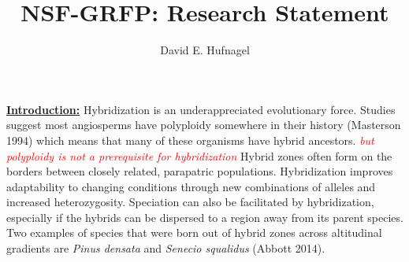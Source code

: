 \documentclass[12pt]{amsart}
\title{NSF-GRFP: Research Statement}
\author{David E. Hufnagel}
\newcommand{\mbh}[1]{\textcolor{red}{ \emph{\scriptsize  #1}} }
\begin{document}
\maketitle

\textbf{\underline{Introduction:} }
Hybridization is an underappreciated evolutionary force.
Studies suggest most angiosperms have polyploidy somewhere in their history (Masterson 1994) which means that many of these organisms have hybrid ancestors. \mbh{but polyploidy is not a prerequisite for hybridization}
Hybrid zones often form on the borders between closely related, parapatric populations. %
Hybridization improves adaptability to changing conditions through new combinations of alleles and increased heterozygosity.
Speciation can also be facilitated by hybridization, especially if the hybrids can be dispersed to a region away from its parent species.
Two examples of species that were born out of hybrid zones across altitudinal gradients are \textit{Pinus densata} and \textit{Senecio squalidus} (Abbott 2014).
\end{document}
